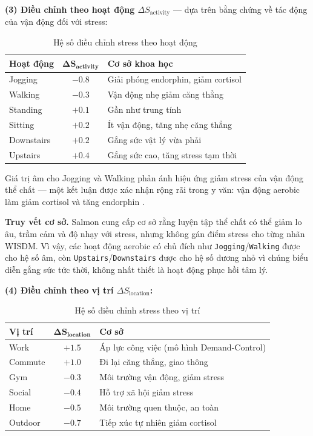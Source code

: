 \textbf{(3) Điều chỉnh theo hoạt động $\Delta S_{\text{activity}}$} — dựa trên bằng chứng về tác động của vận động đối với stress:

\begin{table}[H]
\centering
\caption{Hệ số điều chỉnh stress theo hoạt động}
\label{tab:activity_stress_modifier}
\begin{tabular}{|l|c|l|}
\hline
\textbf{Hoạt động} & $\boldsymbol{\Delta S_{\text{activity}}}$ & \textbf{Cơ sở khoa học} \\
\hline
Jogging    & $-0.8$ & Giải phóng endorphin, giảm cortisol \cite{salmon2001effects} \\
Walking    & $-0.3$ & Vận động nhẹ giảm căng thẳng \\
Standing   & $+0.1$ & Gần như trung tính \\
Sitting    & $+0.2$ & Ít vận động, tăng nhẹ căng thẳng \\
Downstairs & $+0.2$ & Gắng sức vật lý vừa phải \\
Upstairs   & $+0.4$ & Gắng sức cao, tăng stress tạm thời \\
\hline
\end{tabular}
\end{table}

Giá trị âm cho Jogging và Walking phản ánh hiệu ứng giảm stress của vận động thể chất — một kết luận được xác nhận rộng rãi trong y văn: vận động aerobic làm giảm cortisol và tăng endorphin \cite{salmon2001effects}.

\textbf{Truy vết cơ sở.} Salmon cung cấp cơ sở rằng luyện tập thể chất có thể giảm lo âu, trầm cảm và độ nhạy với stress, nhưng không gán điểm stress cho từng nhãn WISDM. Vì vậy, các hoạt động aerobic có chủ đích như \texttt{Jogging}/\texttt{Walking} được cho hệ số âm, còn \texttt{Upstairs}/\texttt{Downstairs} được cho hệ số dương nhỏ vì chúng biểu diễn gắng sức tức thời, không nhất thiết là hoạt động phục hồi tâm lý.

\textbf{(4) Điều chỉnh theo vị trí $\Delta S_{\text{location}}$:}

\begin{table}[H]
\centering
\caption{Hệ số điều chỉnh stress theo vị trí}
\label{tab:location_stress_modifier}
\begin{tabular}{|l|c|l|}
\hline
\textbf{Vị trí} & $\boldsymbol{\Delta S_{\text{location}}}$ & \textbf{Cơ sở} \\
\hline
Work     & $+1.5$ & Áp lực công việc (mô hình Demand-Control) \\
Commute  & $+1.0$ & Đi lại căng thẳng, giao thông \\
Gym      & $-0.3$ & Môi trường vận động, giảm stress \\
Social   & $-0.4$ & Hỗ trợ xã hội giảm stress \\
Home     & $-0.5$ & Môi trường quen thuộc, an toàn \\
Outdoor  & $-0.7$ & Tiếp xúc tự nhiên giảm cortisol \\
\hline
\end{tabular}
\end{table}

